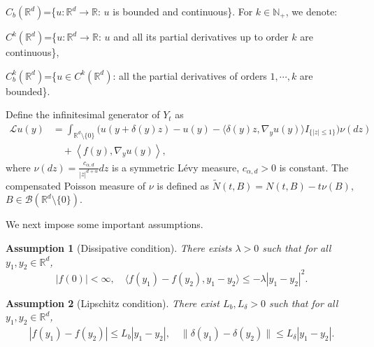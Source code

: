 \documentclass[11pt,reqno]{amsart}
\newtheorem{assumption}{\indent Assumption}[section]
\numberwithin{equation}{section}
\begin{document}
$ C_{b}(\mathbb{R}^{d} )$=\{$u:\mathbb{R}^{d}\to \mathbb{R}$: $u$ is bounded and continuous\}. For $k\in \mathbb{N_+}$, we denote:

$ C^{k}(\mathbb{R}^{d} )$=\{$u:\mathbb{R}^{d}\to \mathbb{R}$: $u$ and all its partial derivatives up to order $k$ are continuous\}, 

$ C^{k}_{b}(\mathbb{R}^{d} )$=\{$u\in  C^{k}(\mathbb{R}^{d})$: all the partial derivatives of  orders $1,\cdots,k$ are bounded\}.


 
Define  %
the infinitesimal generator  of $Y_t$  as
\begin{align}\label{l2}
	 \mathcal{L}u(y)
	 &=\int_{\mathbb R^{d}\setminus\{0\}}\big(u(y+\delta(y)z)-u(y)-\langle\delta(y)z,\nabla_{y}u(y)\rangle I_{\{|z|\leq1\}}\big)\nu(dz)\nonumber\\
	 &\quad+\left\langle f(y),\nabla_{y}u(y)\right\rangle ,
	 \end{align}
where $\nu(dz)=\frac{c_{\alpha,d}}{|z|^{d+\alpha}}dz$ is a symmetric L\'{e}vy measure, $c_{\alpha,d}>0$ is constant. The compensated Poisson measure of $\nu$ is defined as 
$ \tilde N(t,B)=N(t,B)-t\nu(B),$ $B\in\mathcal{B}(\mathbb{R}^d\setminus\{0\})$.






We next impose some important assumptions.






\begin{assumption}[Dissipative condition]\label{dis}
 There exists $\lambda>0$ such that for all
 $y_1,y_2\in\mathbb{R}^{d}$,
\begin{equation}\label{2.2}
|f(0)|<\infty,  \quad	\langle f(y_1)-f(y_2),y_1-y_2\rangle
\leq -\lambda |y_1-y_2|^2 .
\end{equation}		
\end{assumption}

\begin{assumption}[Lipschitz condition]\label{lip}
There exist $L_b,L_\delta>0$ such that for all
$y_1,y_2\in\mathbb{R}^{d}$,
	\begin{align*}
		|f(y_{1})-f(y_{2})| \leq L_b|y_{1}-y_{2}|,
		\quad	\|\delta(y_1)-\delta(y_2)\|
		\leq L_\delta |y_1-y_2|.
	\end{align*}
\end{assumption}
\end{document}
